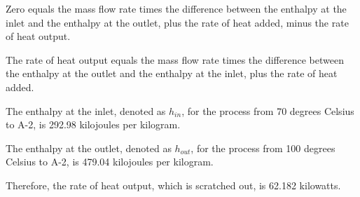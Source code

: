 Zero equals the mass flow rate times the difference between the enthalpy at the inlet and the enthalpy at the outlet, plus the rate of heat added, minus the rate of heat output.

The rate of heat output equals the mass flow rate times the difference between the enthalpy at the outlet and the enthalpy at the inlet, plus the rate of heat added.

The enthalpy at the inlet, denoted as \( h_{in} \), for the process from 70 degrees Celsius to A-2, is 292.98 kilojoules per kilogram.

The enthalpy at the outlet, denoted as \( h_{out} \), for the process from 100 degrees Celsius to A-2, is 479.04 kilojoules per kilogram.

Therefore, the rate of heat output, which is scratched out, is 62.182 kilowatts.